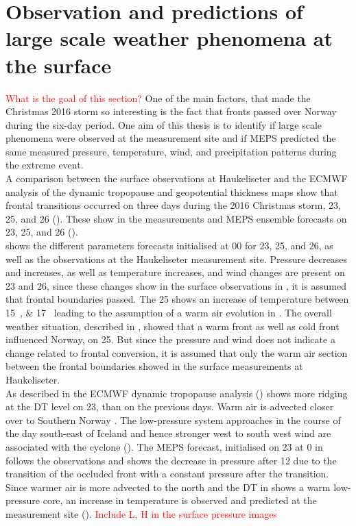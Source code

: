 \section{Observation and predictions of large scale weather phenomena at the surface}\label{sec:res:large_scale_sfc}
\textcolor{red}{What is the goal of this section?}
One of the main factors, that made the Christmas 2016 storm so interesting is the fact that fronts passed over Norway during the six-day period. One aim of this thesis is to identify if large scale phenomena were observed at the measurement site and if MEPS predicted the same measured pressure, temperature, wind, and precipitation patterns during the extreme event. 
\\
A comparison between the surface observations at Haukeliseter and the ECMWF analysis of the dynamic tropopause and geopotential thickness maps show that frontal transitions occurred on three days during the 2016 Christmas storm, \num{23}, \num{25}, and \SI{26}{\dec} ().  
These show in the measurements and MEPS ensemble forecasts on \num{23}, \num{25}, and \SI{26}{\dec} (). 
\\
 shows the different parameters forecasts initialised at \SI{00}{\UTC} for \num{23}, \num{25}, and \SI{26}{\dec}, as well as the observations at the Haukeliseter measurement site.
Pressure decreases and increases, as well as temperature increases, and wind changes are present on \num{23} and \SI{26}{\dec}, since these changes show in the surface observations in , it is assumed that frontal boundaries passed. The \SI{25}{\dec} shows an increase of temperature between \SIlist{15;17}{\UTC} leading to the assumption of a warm air evolution in . The overall weather situation, described in , showed that a warm front as well as cold front influenced Norway, on \SI{25}{\dec}. But since the pressure and wind does not indicate a change related to frontal conversion, it is assumed that only the warm air section between the frontal boundaries showed in the surface measurements at Haukeliseter.   
\\
As described in  the ECMWF dynamic tropopause analysis () shows more ridging at the DT level on \SI{23}{\dec}, than on the previous days. Warm air is advected closer over to Southern Norway . The low-pressure system approaches in the course of the day south-east of Iceland and hence stronger west to south west wind are associated with the cyclone (). The MEPS forecast, initialised on \SI{23}{\dec} at \SI{0}{\UTC} in  follows the observations and shows the decrease in pressure after \SI{12}{\UTC} due to the transition of the occluded front with a constant pressure after the transition. Since warmer air is more advected to the north and the DT in  shows a warm low-pressure core, an increase in temperature is observed and predicted at the measurement site (). \textcolor{red}{Include L, H in the surface pressure images}
